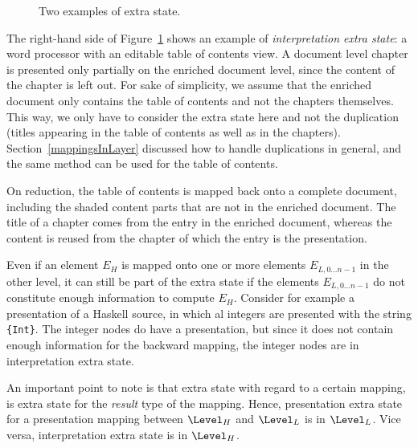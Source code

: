 \begin{figure}
\begin{center}
\begin{center}
\end{center}
\caption{Two examples of extra state.} \label{layerExtraState} 
\end{center}
\end{figure}


The right-hand side of Figure~\ref{layerExtraState} shows an example of {\em interpretation extra state}: a word processor with an editable table of contents view. A document level chapter is presented only partially on the enriched document level, since the content of the chapter is left out. For sake of simplicity, we assume that the enriched document only contains the table of contents and not the chapters themselves. This way, we only have to consider the extra state here and not the duplication (titles appearing in the table of contents as well as in the chapters). Section~\ref{mappingsInLayer} discussed how to handle duplications in general, and the same method can be used for the table of contents.

On reduction, the table of contents is mapped back onto a complete document, including the shaded content parts that are not in the enriched document. The title of a chapter comes from the entry in the enriched document, whereas the content is reused from the chapter of which the entry is the presentation. 



Even if an element $E_H$ is mapped onto one or more elements $E_{L,0\dots n-1}$  in the other level, it can still be part of the extra state if the elements $E_{L,0\dots n-1}$ do not constitute enough information to compute $E_H$. Consider for example a presentation of a Haskell source, in which al integers are presented with the string \verb|{Int}|. The integer nodes do have a presentation, but since it does not contain enough information for the backward mapping, the integer nodes are in interpretation extra state.  

An important point to note is that extra state with regard to a certain mapping, is extra state for the {\em result} type of the mapping. Hence, presentation extra state for a presentation mapping between $\Level_{H}$ and $\Level_{L}$ is in $\Level_{L}$. Vice versa, interpretation extra state is in $\Level_{H}$.

